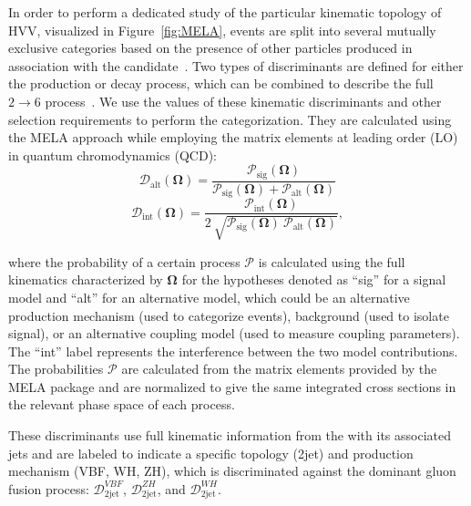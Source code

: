In order to perform a dedicated study of the particular kinematic topology of HVV, visualized in Figure~\ref{fig:MELA}, events are split into several mutually exclusive categories based on the presence of other particles produced in association with the \Hboson candidate~\cite{Sirunyan:2021rug}. Two types of discriminants are defined for either the production or decay process, which can be combined to describe the full $2\to 6$ process~\cite{Sirunyan:2017exp,Sirunyan:2017tqd,Sirunyan:2019twz,Sirunyan:2021rug}. We use the values of these kinematic discriminants and other selection requirements to perform the categorization. They are calculated using the MELA approach while employing the matrix elements at leading order (LO) in quantum chromodynamics (QCD):
\begin{equation}
	\mathcal{D}_\mathrm{alt}\left(\boldsymbol{\Omega}\right) = \frac{\mathcal{P}_\text{sig}\left(\boldsymbol{\Omega}\right) }
	{\mathcal{P}_\text{sig}\left(\boldsymbol{\Omega}\right) +\mathcal{P}_\mathrm{alt}\left(\boldsymbol{\Omega}\right) }
	\label{eq:melaD}
\end{equation}
\begin{equation}
	\mathcal{D}_\mathrm{int}\left(\boldsymbol{\Omega}\right) =
	\frac{\mathcal{P}_\mathrm{int}\left(\boldsymbol{\Omega}\right) }
	{2 \ \sqrt{{\mathcal{P}_\text{sig}\left(\boldsymbol{\Omega}\right) \ \mathcal{P}_\mathrm{alt}\left(\boldsymbol{\Omega}\right) }}},
	\label{eq:melaDint}
\end{equation}

where the probability of a certain process $\mathcal{P}$ is calculated using the full kinematics characterized
by $\boldsymbol{\Omega}$ for the hypotheses denoted as ``sig'' for a signal model and ``alt'' for an alternative model,
which could be an alternative \Hboson production mechanism (used to categorize events),
background (used to isolate signal), or an alternative \Hboson coupling model (used to measure coupling parameters).
The ``int'' label represents the interference between the two model contributions.
The probabilities $\mathcal{P}$ are calculated from the matrix elements provided by the MELA package and
are normalized to give the same integrated cross sections in the relevant phase space of each process.

These discriminants use full kinematic information from the \Hboson with its associated jets and 
are labeled to indicate a specific topology (2jet) and production mechanism (VBF, WH, ZH), 
which is discriminated against the dominant gluon fusion process:
$\mathcal{D}_\mathrm{2jet}^{VBF}$, 
$\mathcal{D}_\mathrm{2jet}^{ZH}$,
and $\mathcal{D}_\mathrm{2jet}^{WH}$. 

